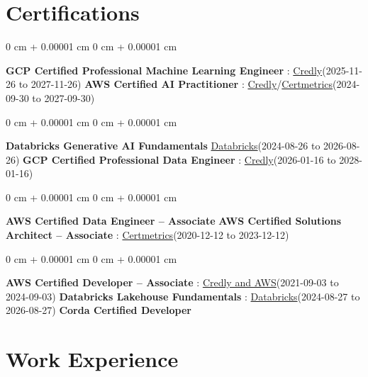 \documentclass[10pt, letterpaper]{article}
\newenvironment{onecolentry}{
    \begin{adjustwidth}{
        0 cm + 0.00001 cm
    }{
        0 cm + 0.00001 cm
    }
}{
    \end{adjustwidth}
} %
\begin{document}
    \section{Certifications}
        \vspace{2 pt }
        \begin{samepage}
            \begin{onecolentry}
                \textbf{GCP Certified Professional Machine Learning Engineer} : \href{https://www.credly.com/badges/a6965347-09ea-4d8f-b398-0e151407160d/public_url}{Credly}(2025-11-26 to 2027-11-26) \quad
                \textbf{AWS Certified AI Practitioner} : \href{https://www.credly.com/badges/451b7ba5-8be1-4a8e-bbec-ade26627a6b6/public_url}{Credly}/\href{https://cp.certmetrics.com/amazon/en/public/verify/credential/495f0d9853874bf9a33c17f8e89ce131}{Certmetrics}(2024-09-30 to 2027-09-30)
            \end{onecolentry}
            \begin{onecolentry}
                \textbf{Databricks Generative AI Fundamentals} \href{https://sgq.io/3uIFGNi}{Databricks}(2024-08-26 to 2026-08-26) \quad
                \textbf{GCP Certified Professional Data Engineer} : \href{https://www.credly.com/badges/977e96d9-12e7-4f6c-b8a7-df71fb7153b8/public_url}{Credly}(2026-01-16 to 2028-01-16)
            \end{onecolentry}
            \begin{onecolentry}
                \textbf{AWS Certified Data Engineer – Associate} \quad
                \textbf{AWS Certified Solutions Architect – Associate} : \href{https://cp.certmetrics.com/amazon/en/public/verify/credential/SNBY48EBJJVE1SWX}{Certmetrics}(2020-12-12 to 2023-12-12)
            \end{onecolentry}
            \begin{onecolentry}
                \textbf{AWS Certified Developer – Associate} : \href{https://www.credly.com/badges/b8106fbd-d3d1-4204-8cdf-e708798fd582/public_url}{Credly and AWS}(2021-09-03 to 2024-09-03) \quad
                \textbf{Databricks Lakehouse Fundamentals} : \href{https://scl.io/FXGKS0u}{Databricks}(2024-08-27 to 2026-08-27) \quad
                \textbf{Corda Certified Developer}
            \end{onecolentry}
        \end{samepage}


    \vspace{2 pt }
    \section{Work Experience}
        \vspace{0.1cm}
\end{document}
